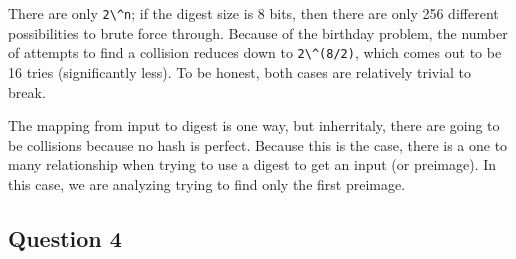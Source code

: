 \documentclass[11pt]{article}
\begin{document}
There are only \verb|2\^n|; if the digest size is 8 bits, then there are only 256 different possibilities to brute force through. Because of the birthday problem, the number of attempts to find a collision reduces down to \verb|2\^(8/2)|, which comes out to be 16 tries (significantly less). To be honest, both cases are relatively trivial to break.

The mapping from input to digest is one way, but inherritaly, there are going to be collisions because no hash is perfect. Because this is the case, there is a one to many relationship when trying to use a digest to get an input (or preimage). In this case, we are analyzing trying to find only the first preimage. 

\subsection*{Question 4}
\end{document}
